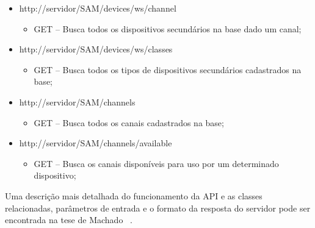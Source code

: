 \begin{itemize}
\begin{itemize}
\end{itemize}
\item http://servidor/SAM/devices/ws/channel
\begin{itemize}
	\item GET -- Busca todos os dispositivos secundários na base dado um canal;
\end{itemize}
\item http://servidor/SAM/devices/ws/classes
\begin{itemize}
	\item GET -- Busca todos os tipos de dispositivos secundários cadastrados na base;
\end{itemize}
\item http://servidor/SAM/channels
\begin{itemize}
	\item GET -- Busca todos os canais cadastrados na base;
\end{itemize}
\item http://servidor/SAM/channels/available
\begin{itemize}
	\item GET -- Busca os canais disponíveis para uso por um determinado dispositivo;
\end{itemize}
\end{itemize}

Uma descrição mais detalhada do funcionamento da API e as classes relacionadas, parâmetros de entrada e o formato da resposta do servidor pode ser encontrada na tese de Machado ~\cite{tccmarcelo}.
